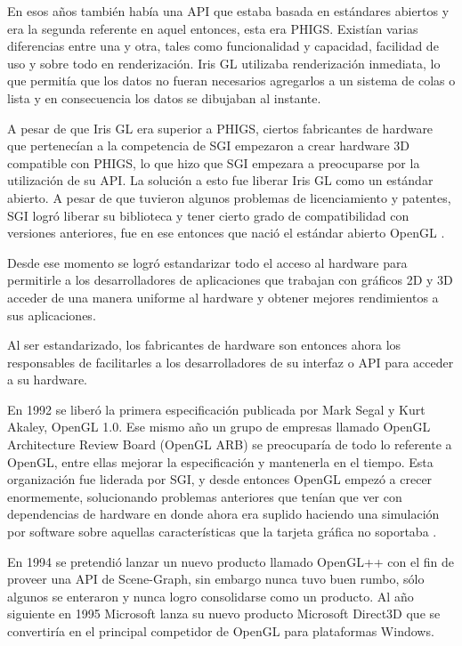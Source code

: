 \documentclass[a4paper,12pt,openany,oneside]{book}
\begin{document}
En esos años también había una API que estaba basada en estándares abiertos y era la segunda referente en aquel entonces, esta era PHIGS. Existían varias diferencias entre una y otra, tales como funcionalidad y capacidad, facilidad de uso y sobre todo en renderización. Iris GL utilizaba renderización inmediata, lo que permitía que los datos no fueran necesarios agregarlos a un sistema de colas o lista y en consecuencia los datos se dibujaban al instante.

A pesar de que Iris GL era superior a PHIGS, ciertos fabricantes de hardware que pertenecían a la competencia de SGI empezaron a crear hardware 3D compatible con PHIGS, lo que hizo que SGI empezara a preocuparse por la utilización de su API. La solución a esto fue liberar Iris GL como un estándar abierto. A pesar de que tuvieron algunos problemas de licenciamiento y patentes, SGI logró liberar su biblioteca y tener cierto grado de compatibilidad con versiones anteriores, fue en ese entonces que nació el estándar abierto OpenGL \cite{WIKIOGL}. 

Desde ese momento se logró estandarizar todo el acceso al hardware para permitirle a los desarrolladores de aplicaciones que trabajan con gráficos 2D y 3D acceder de una manera uniforme al hardware y obtener mejores rendimientos a sus aplicaciones. 

Al ser estandarizado, los fabricantes de hardware son entonces ahora los responsables de facilitarles a los desarrolladores de su interfaz o API para acceder a su hardware.

En 1992 se liberó la primera especificación publicada por Mark Segal y Kurt Akaley, OpenGL 1.0. Ese mismo año un grupo de empresas llamado OpenGL Architecture Review Board (OpenGL ARB) se preocuparía de todo lo referente a OpenGL, entre ellas mejorar la especificación y mantenerla en el tiempo. Esta organización fue liderada por SGI, y desde entonces OpenGL empezó a crecer enormemente, solucionando problemas anteriores que tenían que ver con dependencias de hardware en donde ahora era suplido haciendo una simulación por software sobre aquellas características que la tarjeta gráfica no soportaba \cite{WIKIOGL}.

En 1994 se pretendió lanzar un nuevo producto llamado OpenGL++ con el fin de proveer una API de Scene-Graph, sin embargo nunca tuvo buen rumbo, sólo algunos se enteraron y nunca logro consolidarse como un producto. Al año siguiente en 1995 Microsoft lanza su nuevo producto Microsoft Direct3D que se convertiría en el principal competidor de OpenGL para plataformas Windows. 
\end{document}
